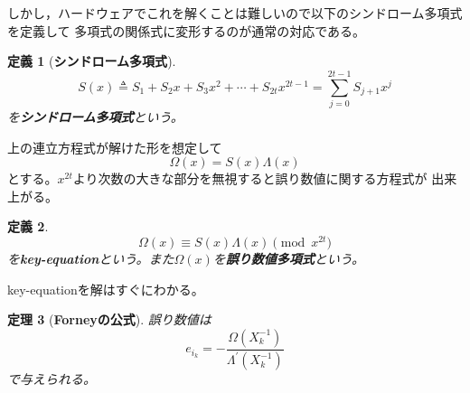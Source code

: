 \documentclass[12pt]{jarticle}
\theoremstyle{break}
\newtheorem{theorem}{定理}[section]
\newtheorem{definition}[theorem]{定義}
\def\itOmega{\mathit{\Omega}}
\def\itLambda{\mathit{\Lambda}}
\def\itLambda{\mathit{\Lambda}}
\begin{document}
しかし，ハードウェアでこれを解くことは難しいので以下のシンドローム多項式を定義して
多項式の関係式に変形するのが通常の対応である。
\begin{framed}
\begin{definition}[{\bf シンドローム多項式}]
\begin{equation}
S(x)\triangleq S_{1}+S_{2}x+S_{3}x^{2}+\cdots
+S_{2t}x^{2t-1}=\sum_{j=0}^{2t-1}S_{j+1}x^{j}\nonumber
\end{equation}
を{\bf シンドローム多項式}という。
\end{definition}
\end{framed}
上の連立方程式が解けた形を想定して
\begin{equation}
\itOmega(x)=S(x)\itLambda(x)
\end{equation}
とする。$x^{2t}$より次数の大きな部分を無視すると誤り数値に関する方程式が
出来上がる。
\begin{framed}
\begin{definition}
\begin{equation}
\itOmega(x)\equiv S(x)\itLambda(x)\pmod{x^{2t}}
\label{eq:key_equation}
\end{equation}
を{\bf key-equation}という。また$\itOmega(x)$を{\bf 誤り数値多項式}という。
\end{definition}
\end{framed}
key-equationを解はすぐにわかる。
\begin{framed}
\begin{theorem}[{\bf Forneyの公式}]
誤り数値は
\begin{equation}
e_{i_{k}}=-\frac{\itOmega(X_{k}^{-1})}{\itLambda^{\prime}(X_{k}^{-1})}
\label{eq:forney}
\end{equation}
で与えられる。
\end{theorem}
\end{framed}
\end{document}
